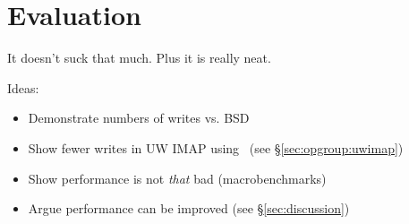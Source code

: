 \section {Evaluation}
\label{sec:evaluation}
\label{sec:evaluation:uwimap}

It doesn't suck that much. Plus it is really neat.

Ideas:
\begin{itemize}
\item Demonstrate numbers of writes vs. BSD
\item Show fewer writes in UW IMAP using \opgroups\ (see \S\ref{sec:opgroup:uwimap})
\item Show performance is not \emph{that} bad (macrobenchmarks)
\item Argue performance can be improved (see \S\ref{sec:discussion})
\end{itemize}
